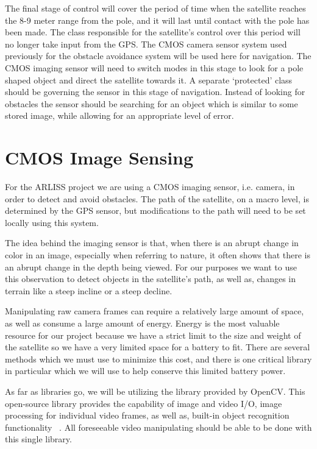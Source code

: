 \documentclass[10pt,letterpaper,onecolumn,journal]{IEEEtran}
\begin{document}
\par
The final stage of control will cover the period of time when the satellite reaches the 8-9 meter range from the pole, and it will last until contact with the pole has been made. The class responsible for the satellite's control over this period will no longer take input from the GPS. The CMOS camera sensor system used previously for the obstacle avoidance system will be used here for navigation. The CMOS imaging sensor will need to switch modes in this stage to look for a pole shaped object and direct the satellite towards it. A separate ‘protected’ class should be governing the sensor in this stage of navigation. Instead of looking for obstacles the sensor should be searching for an object which is similar to some stored image, while allowing for an appropriate level of error. 
%
%
\section{CMOS Image Sensing}
For the ARLISS project we are using a CMOS imaging sensor, i.e. camera, in order to detect and avoid obstacles. The path of the satellite, on a macro level, is determined by the GPS sensor, but modifications to the path will need to be set locally using this system.\vspace{.3cm}
\par
The idea behind the imaging sensor is that, when there is an abrupt change in color in an image, especially when referring to nature, it often shows that there is an abrupt change in the depth being viewed. For our purposes we want to use this observation to detect objects in the satellite's path, as well as, changes in terrain like a steep incline or a steep decline.\vspace{.3cm}
\par  
Manipulating raw camera frames can require a relatively large amount of space, as well as consume a large amount of energy. Energy is the most valuable resource for our project because we have a strict limit to the size and weight of the satellite so we have a very limited space for a battery to fit. There are several methods which we must use to minimize this cost, and there is one critical library in particular which we will use to help conserve this limited battery power.\vspace{.3cm}
\par 
As far as libraries go, we will be utilizing the library provided by OpenCV. This open-source library provides the capability of image and video I/O, image processing for individual video frames, as well as, built-in object recognition functionality ~\cite{agam2006}. All foreseeable video manipulating should be able to be done with this single library.\vspace{.3cm}
\end{document}
